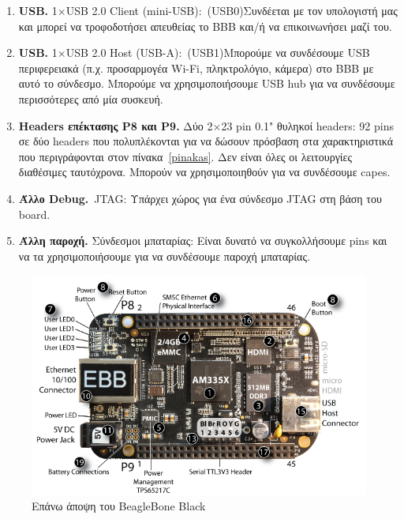\documentclass[12pt, a4paper, oneside]{report}
\def\itemrange#1{%
\addtocounter{enumi}{1}%
\edef\labelenumi{\theenumi--\noexpand\theenumi.}%
\addtocounter{enumi}{-1}%
\addtocounter{enumi}{#1}%
\item
\def\labelenumi{\theenumi.}}
\begin{document}
\begin{enumerate}
\item {\large\textbf{USB.}} 1$\times$USB 2.0 Client (mini-USB):~(USB0)Συνδέεται με τον υπολογιστή μας και μπορεί να τροφοδοτήσει απευθείας το BBB και\slash ή να επικοινωνήσει μαζί του.
\item {\large\textbf{USB.}} 1$\times$USB 2.0 Host (USB-A):~(USB1)Μπορούμε να συνδέσουμε USB περιφερειακά (π.χ. προσαρμογέα Wi-Fi, πληκτρολόγιο, κάμερα) στο BBB με αυτό το σύνδεσμο. Μπορούμε να χρησιμοποιήσουμε USB hub για να συνδέσουμε περισσότερες από μία συσκευή.
\itemrange{1} {\large\textbf{Headers επέκτασης P8 και P9.}} Δύο 2$\times$23 pin 0.1" θυληκοί headers: 92 pins σε δύο headers που πολυπλέκονται για να δώσουν πρόσβαση στα χαρακτηριστικά που περιγράφονται στον πίνακα~\ref{pinakas}. Δεν είναι όλες οι λειτουργίες διαθέσιμες ταυτόχρονα. Μπορούν να χρησιμοποιηθούν για να συνδέσουμε capes.
\item {\large\textbf{Άλλο Debug.}}~JTAG: Υπάρχει χώρος για ένα σύνδεσμο JTAG στη βάση του board.
\item {\large\textbf{Άλλη παροχή.}} Σύνδεσμοι μπαταρίας: Είναι δυνατό να συγκολλήσουμε pins και να τα χρησιμοποιήσουμε για να συνδέσουμε παροχή μπαταρίας.
\end{enumerate}

\begin{figure}[p]
\centering
\includegraphics[width=\textwidth]{eikona_20}
\caption[Επάνω άποψη του BeagleBone Black]{Επάνω άποψη του BeagleBone Black\cite{46}}\label{eik20}
\end{figure}
\end{document}
